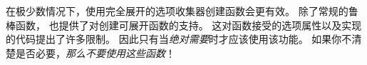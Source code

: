 \documentclass{l3doc}
\begin{document}
%
在极少数情况下，使用完全展开的选项收集器创建函数会更有效。
除了常规的鲁棒函数， 也提供了对创建可展开函数的支持。
这对函数接受的选项属性以及实现的代码提出了许多限制。
因此只有当\emph{绝对需要}时才应该使用该功能。
如果你不清楚是否必要，\emph{那么不要使用这些函数}！

\end{document}
